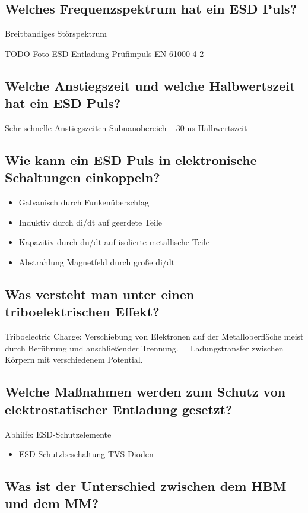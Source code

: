 \subsection{Welches Frequenzspektrum hat ein ESD Puls?}
Breitbandiges Störspektrum

TODO Foto ESD Entladung Prüfimpuls EN 61000-4-2

\subsection{Welche Anstiegszeit und welche Halbwertszeit hat ein ESD Puls?}
Sehr schnelle Anstiegszeiten Subnanobereich
~ 30 ns Halbwertszeit

\subsection{Wie kann ein ESD Puls in elektronische Schaltungen einkoppeln?}
\begin{itemize}
  \item Galvanisch durch Funkenüberschlag
  \item Induktiv durch di/dt auf geerdete Teile
  \item Kapazitiv durch du/dt auf isolierte metallische Teile
  \item Abstrahlung Magnetfeld durch große di/dt
\end{itemize}

\subsection{Was versteht man unter einen triboelektrischen Effekt?}
Triboelectric Charge: Verschiebung von Elektronen auf der Metalloberfläche meist durch Berührung und anschließender Trennung.
= Ladungstransfer zwischen Körpern mit verschiedenem Potential.

\subsection{Welche Maßnahmen werden zum Schutz von elektrostatischer Entladung gesetzt?}
Abhilfe: ESD-Schutzelemente
\begin{itemize}
  \item ESD Schutzbeschaltung TVS-Dioden
\end{itemize}

\subsection{Was ist der Unterschied zwischen dem HBM und dem MM?}

